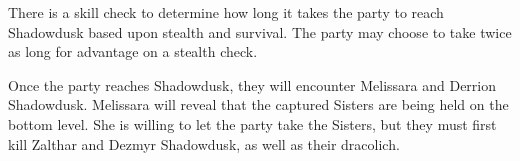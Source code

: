 There is a skill check to determine how long it takes the party to reach Shadowdusk based upon stealth and survival.
The party may choose to take twice as long for advantage on a stealth check.

Once the party reaches Shadowdusk, they will encounter Melissara and Derrion Shadowdusk.
Melissara will reveal that the captured Sisters are being held on the bottom level.
She is willing to let the party take the Sisters, but they must first kill Zalthar and Dezmyr Shadowdusk, as well as their dracolich.
